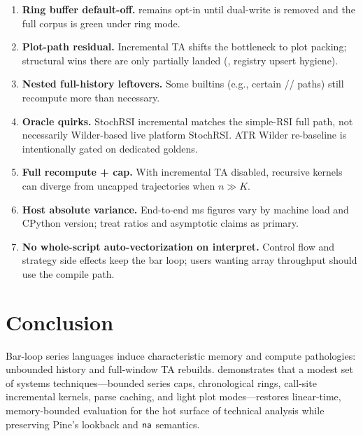 \documentclass[11pt,a4paper]{article}
\begin{document}
\begin{enumerate}[leftmargin=*]
  \item \textbf{Ring buffer default-off.}   remains
        opt-in until dual-write is removed and the full corpus is green under
        ring mode.
  \item \textbf{Plot-path residual.}  Incremental TA shifts the bottleneck to
        plot packing; structural wins there are only partially landed
        (, registry upsert hygiene).
  \item \textbf{Nested full-history leftovers.}  Some builtins (e.g., certain
        // paths) still recompute more than
        necessary.
  \item \textbf{Oracle quirks.}  StochRSI incremental matches the simple-RSI
        full path, not necessarily Wilder-based live platform StochRSI.
        ATR Wilder re-baseline is intentionally gated on dedicated goldens.
  \item \textbf{Full recompute + cap.}  With incremental TA disabled, recursive
        kernels can diverge from uncapped trajectories when $n\gg K$.
  \item \textbf{Host absolute variance.}  End-to-end ms figures vary by machine
        load and CPython version; treat ratios and asymptotic claims as primary.
  \item \textbf{No whole-script auto-vectorization on interpret.}  Control flow
        and strategy side effects keep the bar loop; users wanting array
        throughput should use the compile path.
\end{enumerate}

\section{Conclusion}
\label{sec:concl}

Bar-loop series languages induce characteristic memory and compute pathologies:
unbounded history and full-window TA rebuilds.  \pyne{} demonstrates that a
modest set of systems techniques---bounded series caps, chronological rings,
call-site incremental kernels, parse caching, and light plot modes---restores
linear-time, memory-bounded evaluation for the hot surface of technical
analysis while preserving Pine's lookback and $\textsf{na}$ semantics.
\end{document}
